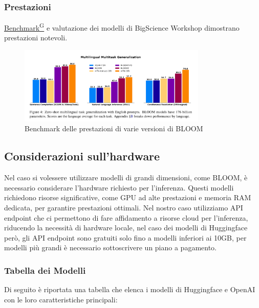 \documentclass{article}
\begin{document}
\subsubsection{Prestazioni}
\href{https://code7crusaders.github.io/docs/RTB/documentazione_interna/glossario.html#benchmark}{Benchmark\textsuperscript{G}} e valutazione dei modelli di BigScience Workshop dimostrano prestazioni notevoli.

\begin{figure}[H]
    \centering
    \includegraphics[width=0.8\textwidth]{img/performance_benchmark_bloom.png}
    \caption{Benchmark delle prestazioni di varie versioni di BLOOM}
    \label{fig:performance_benchmark_bloom}
\end{figure}

\subsection{Considerazioni sull'hardware}
Nel caso si volessere utilizzare modelli di grandi dimensioni, come BLOOM, è necessario considerare l'hardware richiesto per l'inferenza. Questi modelli richiedono risorse significative, come GPU ad alte prestazioni e memoria RAM dedicata, per garantire prestazioni ottimali.
Nel nostro caso utilizziamo API endpoint che ci permettono di fare affidamento a risorse cloud per l'inferenza, riducendo la necessità di hardware locale, nel caso dei modelli di Huggingface però, gli API endpoint sono gratuiti solo fino a modelli inferiori ai 10GB, per modelli più grandi è necessario sottoscrivere un piano a pagamento.
\subsubsection{Tabella dei Modelli}
Di seguito è riportata una tabella che elenca i modelli di Huggingface e OpenAI con le loro caratteristiche principali:
\end{document}

